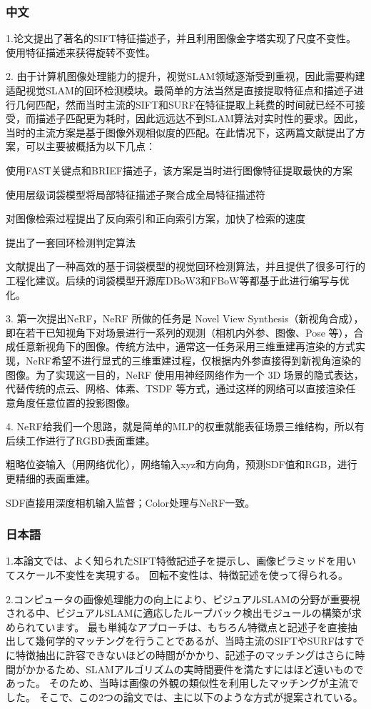 \documentclass[lang=cn,11pt,a4paper]{elegantpaper}
\begin{document}
\subsubsection{中文}
1.论文提出了著名的SIFT特征描述子，并且利用图像金字塔实现了尺度不变性。使用特征描述来获得旋转不变性。

2. 由于计算机图像处理能力的提升，视觉SLAM领域逐渐受到重视，因此需要构建适配视觉SLAM的回环检测模块。最简单的方法当然是直接提取特征点和描述子进行几何匹配，然而当时主流的SIFT和SURF在特征提取上耗费的时间就已经不可接受，而描述子匹配更为耗时，因此远远达不到SLAM算法对实时性的要求。因此，当时的主流方案是基于图像外观相似度的匹配。在此情况下，这两篇文献提出了方案，可以主要被概括为以下几点：

使用FAST关键点和BRIEF描述子，该方案是当时进行图像特征提取最快的方案

使用层级词袋模型将局部特征描述子聚合成全局特征描述符

对图像检索过程提出了反向索引和正向索引方案，加快了检索的速度

提出了一套回环检测判定算法 

文献提出了一种高效的基于词袋模型的视觉回环检测算法，并且提供了很多可行的工程化建议。后续的词袋模型开源库DBoW3和FBoW等都基于此进行编写与优化。

3. 第一次提出NeRF，NeRF 所做的任务是 Novel View Synthesis（新视角合成），即在若干已知视角下对场景进行一系列的观测（相机内外参、图像、Pose 等），合成任意新视角下的图像。传统方法中，通常这一任务采用三维重建再渲染的方式实现，NeRF希望不进行显式的三维重建过程，仅根据内外参直接得到新视角渲染的图像。为了实现这一目的，NeRF 使用用神经网络作为一个 3D 场景的隐式表达，代替传统的点云、网格、体素、TSDF 等方式，通过这样的网络可以直接渲染任意角度任意位置的投影图像。

4. NeRF给我们一个思路，就是简单的MLP的权重就能表征场景三维结构，所以有后续工作进行了RGBD表面重建。

粗略位姿输入（用网络优化），网络输入xyz和方向角，预测SDF值和RGB，进行更精细的表面重建。

SDF直接用深度相机输入监督；Color处理与NeRF一致。


\subsubsection{日本語}
1.本論文では、よく知られたSIFT特徴記述子を提示し、画像ピラミッドを用いてスケール不変性を実現する。 回転不変性は、特徴記述を使って得られる。

2.コンピュータの画像処理能力の向上により、ビジュアルSLAMの分野が重要視される中、ビジュアルSLAMに適応したループバック検出モジュールの構築が求められています。 最も単純なアプローチは、もちろん特徴点と記述子を直接抽出して幾何学的マッチングを行うことであるが、当時主流のSIFTやSURFはすでに特徴抽出に許容できないほどの時間がかかり、記述子のマッチングはさらに時間がかかるため、SLAMアルゴリズムの実時間要件を満たすにはほど遠いものであった。 そのため、当時は画像の外観の類似性を利用したマッチングが主流でした。 そこで、この2つの論文では、主に以下のような方式が提案されている。
\end{document}
